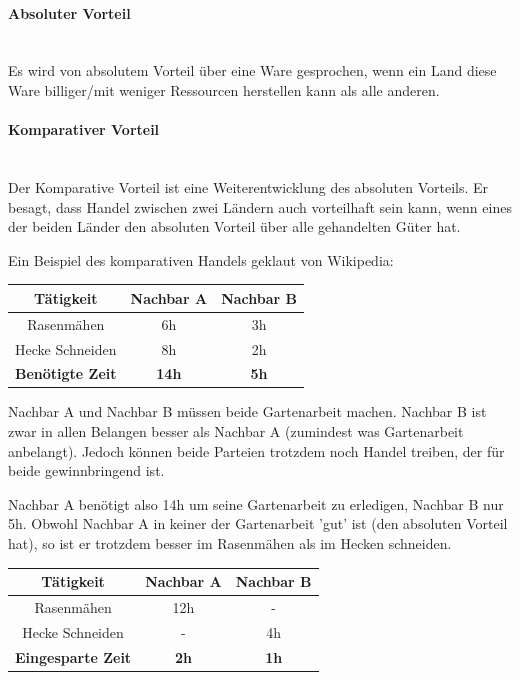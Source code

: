 \documentclass[a4paper, 11pt]{article}
\begin{document}
\begin{multicols}{2}
	\paragraph{Absoluter Vorteil} \mbox{} \\
	Es wird von absolutem Vorteil über eine Ware gesprochen, wenn ein Land diese Ware billiger/mit weniger Ressourcen herstellen kann als alle anderen.
\columnbreak
	\paragraph{Komparativer Vorteil} \mbox{}\\
	Der Komparative Vorteil ist eine Weiterentwicklung des absoluten Vorteils. Er besagt, dass Handel zwischen zwei Ländern auch vorteilhaft sein kann, wenn eines der beiden Länder den absoluten Vorteil über alle gehandelten Güter hat.
\end{multicols}

Ein Beispiel des komparativen Handels geklaut von Wikipedia:

\vspace{10px}
\begin{table}
	\begin{tabular}{|c|c|c|}
		\hline
		\textbf{Tätigkeit} & \textbf{Nachbar A} & \textbf{Nachbar B} \\
		\hline
		Rasenmähen & 6h & 3h \\
		\hline
		Hecke Schneiden & 8h & 2h \\
		\hline
		\textbf{Benötigte Zeit} & \textbf{14h} & \textbf{5h} \\
		\hline
	\end{tabular}
\end{table}

Nachbar A und Nachbar B müssen beide Gartenarbeit machen. Nachbar B ist zwar in allen Belangen besser als Nachbar A (zumindest was Gartenarbeit anbelangt). Jedoch können beide Parteien trotzdem noch Handel treiben, der für beide gewinnbringend ist.

\vspace{10px}

Nachbar A benötigt also 14h um seine Gartenarbeit zu erledigen, Nachbar B nur 5h. Obwohl Nachbar A in keiner der Gartenarbeit 'gut' ist (den absoluten Vorteil hat), so ist er trotzdem besser im Rasenmähen als im Hecken schneiden. 

\begin{table}
	\begin{tabular}{|c|c|c|}
		\hline
		\textbf{Tätigkeit} & \textbf{Nachbar A} & \textbf{Nachbar B} \\
		\hline
		Rasenmähen & 12h & - \\
		\hline
		Hecke Schneiden & - & 4h \\
		\hline
		\textbf{Eingesparte Zeit} & \textbf{2h} & \textbf{1h} \\
		\hline
	\end{tabular}
\end{table}
\end{document}
